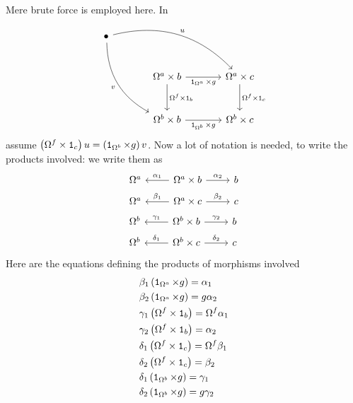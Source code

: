 Mere brute force is employed here. In
\[\begin{tikzcd}[sep=large]
\bullet \ar["u", drr, bend left] \ar["v", ddr, swap, bend right] \\
& \Omega^a \times b \ar["{\Omega^f \times \id_b}", d] \ar["{\id_{\Omega^a} \times g}", r, swap] & \Omega^a \times c \ar["{\Omega^f \times \id_c}", d] \\
& \Omega^b \times b \ar["{\id_{\Omega^b} \times g}", r, swap] & \Omega^b \times c
\end{tikzcd}\]
assume \(\left( \Omega^f \times \operatorname{\mathtt 1}_c \right) u = \left( \operatorname{\mathtt 1}_{\Omega^b} \times g \right) v\). Now a lot of notation is needed, to write the products involved: we write them as
\begin{align*}
& \begin{tikzcd}[ampersand replacement=\&] \Omega^a \& \Omega^a \times b \ar["{\alpha_1}", l, swap] \ar["{\alpha_2}", r] \& b \end{tikzcd} \\
& \begin{tikzcd}[ampersand replacement=\&] \Omega^a \& \Omega^a \times c \ar["{\beta_1}", l, swap] \ar["{\beta_2}", r] \& c \end{tikzcd} \\
& \begin{tikzcd}[ampersand replacement=\&] \Omega^b \& \Omega^b \times b \ar["{\gamma_1}", l, swap] \ar["{\gamma_2}", r] \& b \end{tikzcd} \\
& \begin{tikzcd}[ampersand replacement=\&] \Omega^b \& \Omega^b \times c \ar["{\delta_1}", l, swap] \ar["{\delta_2}", r] \& c \end{tikzcd}
\end{align*}
Here are the equations defining the products of morphisms involved
\begin{align*}
& \beta_1 \left( \operatorname{\mathtt 1}_{\Omega^a} \times g \right) = \alpha_1 \\
& \beta_2 \left( \operatorname{\mathtt 1}_{\Omega^a} \times g \right) = g \alpha_2 \\
& \gamma_1 \left( \Omega^f \times \operatorname{\mathtt 1}_b \right) = \Omega^f \alpha_1 \\
& \gamma_2 \left( \Omega^f \times \operatorname{\mathtt 1}_b \right) = \alpha_2 \\
& \delta_1 \left( \Omega^f \times \operatorname{\mathtt 1}_c \right) = \Omega^f \beta_1 \\
& \delta_2 \left( \Omega^f \times \operatorname{\mathtt 1}_c \right) = \beta_2 \\
& \delta_1 \left( \operatorname{\mathtt 1}_{\Omega^b} \times g \right) = \gamma_1 \\
& \delta_2 \left( \operatorname{\mathtt 1}_{\Omega^b} \times g \right) = g \gamma_2
\end{align*}
